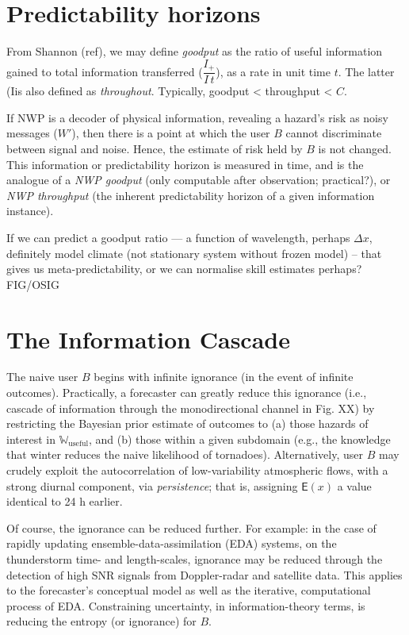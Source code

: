 \documentclass{ametsoc}
\newcommand*{\expect}{\mathsf{E}}
\def\lt{\textless}
\def\dx{$\Delta x$}
\begin{document}
\section{Predictability horizons}
From Shannon (ref), we may define \emph{goodput} as the ratio of useful information gained to total information transferred ($\dfrac{I_+}{I\,t}$), as a rate in unit time $t$. The latter (Iis also defined as \emph{throughout}. Typically, goodput \lt{} throughput \lt{} $C$. 

If NWP is a decoder of physical information, revealing a hazard's risk as noisy messages ($W'$), then there is a point at which the user $B$ cannot discriminate between signal and noise. Hence, the estimate of risk held by $B$ is not changed. This information or predictability horizon is measured in time, and is the analogue of a \emph{NWP goodput} (only computable after observation; practical?), or \emph{NWP throughput} (the inherent predictability horizon of a given information instance).

If we can predict a goodput ratio --- a function of wavelength, perhaps \dx, definitely model climate (not stationary system without frozen model) -- that gives us meta-predictability, or we can normalise skill estimates perhaps? FIG/OSIG

\section{The Information Cascade}
The naive user $B$ begins with infinite ignorance (in the event of infinite outcomes). Practically, a forecaster can greatly reduce this ignorance (i.e., cascade of information through the monodirectional channel in Fig. XX) by restricting the Bayesian prior estimate of outcomes to (a) those hazards of interest in $\mathbb{W}_\textrm{useful}$, and (b) those within a given subdomain (e.g., the knowledge that winter reduces the naive likelihood of tornadoes). Alternatively, user $B$ may crudely exploit the autocorrelation of low-variability atmospheric flows, with a strong diurnal component, via \emph{persistence}; that is, assigning $\expect(x)$ a value identical to 24 h earlier.

Of course, the ignorance can be reduced further. For example: in the case of rapidly updating ensemble-data-assimilation (EDA) systems, on the thunderstorm time- and length-scales, ignorance may be reduced through the detection of high SNR signals from Doppler-radar and satellite data. This applies to the forecaster's conceptual model as well as the iterative, computational process of EDA. Constraining uncertainty, in information-theory terms, is reducing the entropy (or ignorance) for $B$. 
\end{document}

